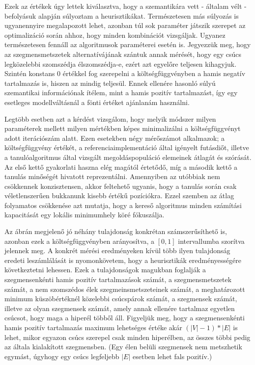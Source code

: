 Ezek az értékek úgy lettek kiválasztva, hogy a szemantikára vett - általam vélt - befolyásuk alapján súlyoztam a heurisztikákat. Természetesen más súlyozás is ugyanennyire megalapozott lehet, azonban túl sok paraméter játszik szerepet az optimalizáció során ahhoz, hogy minden kombinációt vizsgáljak. Ugyanez természetesen fennáll az algoritmusok paraméterei esetén is. Jegyezzük meg, hogy az szegmensmetszetek alternatívájának szántuk annak mérését, hogy egy csúcs legközelebbi szomszédja élszomszédja-e, ezért azt egyelőre teljesen kihagyjuk. Szintén konstans 0 értékkel fog szerepelni a költségfüggvényben a hamis negatív tartalmazás is, hiszen az mindig teljesül. Ennek ellenére hasonló súlyú szemantikai információnak ítélem, mint a hamis pozitív tartalmazást, így egy esetleges modellváltásnál a fönti értéket ajánlanám használni.

Legtöbb esetben azt a kérdést vizsgálom, hogy melyik módszer milyen paraméterek mellett milyen mértékben képes minimalizálni a költségfüggvényt adott iterációszám alatt. Ezen esetekben négy mérőszámot alkalmazok; a költségfüggvény értékét, a referenciaimplementáció által igényelt futásdiőt, illetve a tanulóalgoritmus által vizsgált megoldáspopuláció elemeinek átlagát és szórását. Az első kettő gyakorlati haszna elég magától értetődő, míg a második kettő a tanulás minőségét hivatott reprezentálni. Amennyiben az utóbbiak nem csökkennek konzisztensen, akkor feltehető ugyanis, hogy a tanulás során csak véletlenszerűen bukkanunk kisebb értékű pozíciókra. Ezzel szemben az átlag folyamatos csökkenése azt mutatja, hogy a kereső algoritmus minden számítási kapacitását egy lokális minimumhely köré fókuszálja.

Az ábrán megjelenő jó néhány tulajdonság konkrétan számszerűsíthető is, azonban ezek a költségfüggvényben arányosítva, a $[0,1]$ intervallumba szorítva jelennek meg. A konkrét mérési eredményeken kívül több ilyen tulajdonság eredeti leszámlálását is nyomonkövetem, hogy a heurisztikák eredményességére következtetni lehessen. Ezek a tulajdonságok magukban foglalják a szegmensenkénti hamis pozitív tartalmazások számát, a szegmensmetszetek számát, a nem szomszédos élek szegmeinsmetszeteinek számát, a meghatározott minimum küszöbértéknél közelebbi csúcspárok számát, a szegmensek számát, illetve az olyan szegmensek számát, amely annak ellenére tartalmaz egyetlen csúcsot, hogy maga a hiperél többől áll. Figyeljük meg, hogy a szegmensenkénti hamis pozitív tartalmazás maximum lehetséges értéke akár $(|V|-1)*|E|$ is lehet, mikor egyazon csúcs szerepel csak minden hiperélben, az összes többi pedig az általa kialakított szegmensben. (Egy élen belüli szegmensek nem metszhetik egymást, úgyhogy egy csúcs legfeljebb $|E|$ esetben lehet fals pozitív.)

